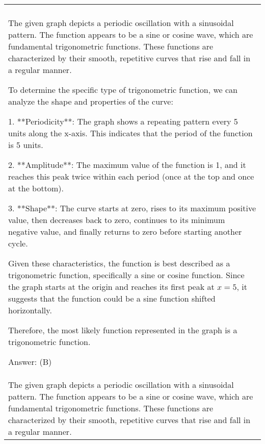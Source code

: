 \begin{table*}[htbp]
    \ContinuedFloat
    \begin{tabular}{p{14cm}}
        \centering

                \begin{tcolorbox}[colback=gray!5, colframe=gray!40, sharp corners, width=\linewidth, boxrule=0.5mm]
        \small
        \textbf{$\alpha=1.1$:}
        \\
The given graph depicts a periodic oscillation with a sinusoidal pattern. The function appears to be a sine or cosine wave, which are fundamental trigonometric functions. These functions are characterized by their smooth, repetitive curves that rise and fall in a regular manner.

To determine the specific type of trigonometric function, we can analyze the shape and properties of the curve:

1. **Periodicity**: The graph shows a repeating pattern every 5 units along the x-axis. This indicates that the period of the function is 5 units.

2. **Amplitude**: The maximum value of the function is 1, and it reaches this peak twice within each period (once at the top and once at the bottom).

3. **Shape**: The curve starts at zero, rises to its maximum positive value, then decreases back to zero, continues to its minimum negative value, and finally returns to zero before starting another cycle.

Given these characteristics, the function is best described as a trigonometric function, specifically a sine or cosine function. Since the graph starts at the origin and reaches its first peak at \( x = 5 \), it suggests that the function could be a sine function shifted horizontally.

Therefore, the most likely function represented in the graph is a trigonometric function.

Answer: (B)


\end{tcolorbox}
        \begin{tcolorbox}[colback=gray!5, colframe=gray!40, sharp corners, width=\linewidth, boxrule=0.5mm]
        \small
        \textbf{$\alpha=1.2$:}
        \\
The given graph depicts a periodic oscillation with a sinusoidal pattern. The function appears to be a sine or cosine wave, which are fundamental trigonometric functions. These functions are characterized by their smooth, repetitive curves that rise and fall in a regular manner.


\end{tcolorbox}
\end{tabular}
\end{table*}
